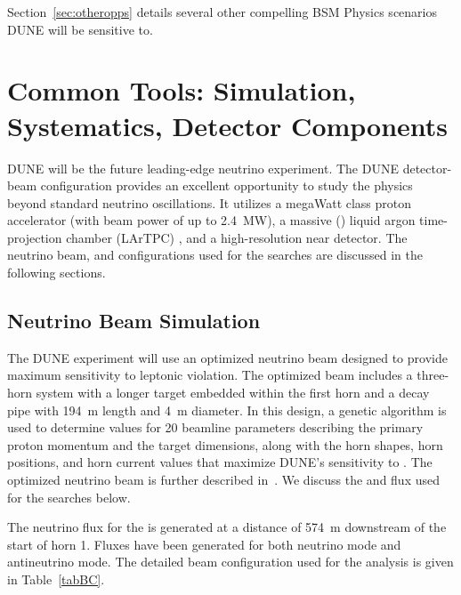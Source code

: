 Section~\ref{sec:otheropps} details several other compelling BSM Physics scenarios DUNE will be sensitive to.

\section{Common Tools: Simulation, Systematics, Detector Components}
\label{sec:tools}

DUNE will be the future leading-edge neutrino experiment. The DUNE detector-beam configuration provides an excellent opportunity to study the physics beyond standard neutrino
oscillations. It utilizes a megaWatt class proton accelerator (with beam power of up to \SI{2.4}{MW}), a massive (\fdfiducialmass) liquid argon time-projection chamber (LArTPC) , and a high-resolution near detector. The neutrino beam,  and  configurations used for the  searches are discussed in the following sections.

\subsection{Neutrino Beam Simulation}
\label{Nusim}

The DUNE experiment will use an optimized neutrino beam designed to provide maximum sensitivity to leptonic  violation. The optimized beam includes a three-horn system with a longer target embedded within the first horn and a decay pipe with \SI{194}{m} length and \SI{4}{m} diameter. In this design, a genetic algorithm is used to determine values for 20 beamline parameters describing the primary proton momentum and the target dimensions, along with the horn shapes, horn positions, and horn current values that maximize DUNE's sensitivity to . The optimized neutrino beam is further described in~\cite{bib:docdb4559}. We discuss the  and  flux used for the  searches below. 

The neutrino flux for the  is generated at a distance of \SI{574}{m} downstream of the start of horn 1. Fluxes have been generated for both neutrino mode and antineutrino mode. The detailed beam configuration used for the   analysis is given in Table~\ref{tabBC}.

